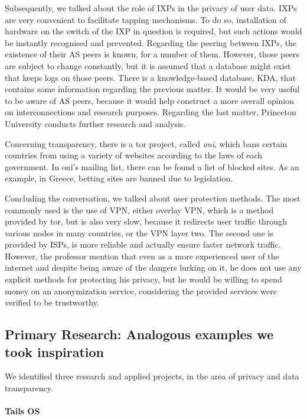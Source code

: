 Subsequently, we talked about the role of IXPs in the privacy of user data. IXPs 
are very convenient to facilitate tapping mechanisms. To do so, installation of 
hardware on the switch of the IXP in question is required, but such actions 
would be instantly recognised and prevented. Regarding the peering between IXPs, 
the existence of their AS peers is known, for a number of them. However, those 
peers are subject to change constantly, but it is assumed that a database might 
exist that keeps logs on those peers. There is a knowledge-based database, KDA, 
that contains some information regarding the previous matter. It would be very 
useful to be aware of AS peers, because it would help construct a more overall 
opinion on interconnections and research purposes. Regarding the last matter, 
Princeton University conducts further research and analysis.

Concerning transparency, there is a tor project, called \emph{oni}, which bans 
certain countries from using a variety of websites according to the laws of each 
government. In oni's mailing list, there can be found a list of blocked sites. 
As an example, in Greece, betting sites are banned due to legislation.

Concluding the conversation, we talked about user protection methods. The most 
commonly used is the use of VPN, either overlay VPN, which is a method provided 
by tor, but is also very slow, because it redirects user traffic through various 
nodes in many countries, or the VPN layer two. The second one is provided by 
ISPs, is more reliable and actually ensure faster network traffic. However, the 
professor mention that even as a more experienced user of the internet and 
despite being aware of the dangers lurking on it, he does not use any explicit 
methods for protecting his privacy, but he would be willing to spend money on an 
anonymization service, considering the provided services were verified to be 
trustworthy.

\subsection{Primary Research: Analogous examples we took inspiration}

We identified three research and applied projects, in the area of privacy and 
data transparency.

\paragraph{Tails OS}

